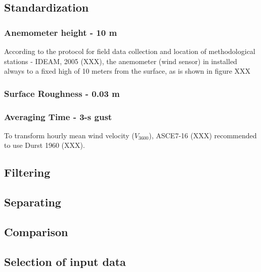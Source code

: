 \documentclass[12pt,oneside]{reedthesis}
\begin{document}
\hypertarget{standardization}{%
\subsection{Standardization}\label{standardization}}

\hypertarget{anemometer-height---10-m}{%
\subsubsection{Anemometer height - 10 m}\label{anemometer-height---10-m}}

According to the protocol for field data collection and location of methodological stations - IDEAM, 2005 (XXX), the anemometer (wind sensor) in installed always to a fixed high of 10 meters from the surface, as is shown in figure XXX

\hypertarget{surface-roughness---0.03-m}{%
\subsubsection{Surface Roughness - 0.03 m}\label{surface-roughness---0.03-m}}

\hypertarget{averaging-time---3-s-gust}{%
\subsubsection{Averaging Time - 3-s gust}\label{averaging-time---3-s-gust}}

To transform hourly mean wind velocity (\(V_{3600}\)), ASCE7-16 (XXX) recommended to use Durst 1960 (XXX).

\hypertarget{filtering}{%
\subsection{Filtering}\label{filtering}}

\hypertarget{separating}{%
\subsection{Separating}\label{separating}}

\hypertarget{comparison}{%
\subsection{Comparison}\label{comparison}}

\hypertarget{selection-of-input-data}{%
\subsection{Selection of input data}\label{selection-of-input-data}}
\end{document}
